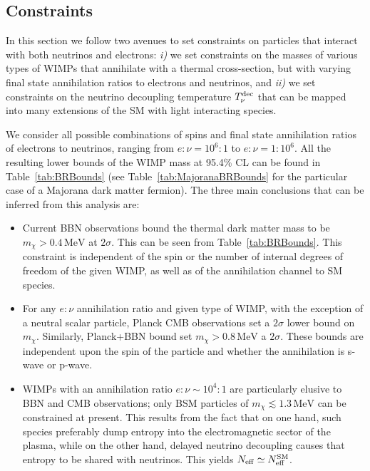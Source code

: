 \documentclass[notitlepage,letterpaper,natbib,aps,prd,onecolumn,amsmath,amsfonts,nofootinbib,preprintnumbers,superscriptaddress,secnumarabic,groupedaddress]{revtex4-1}
\begin{document}
\newpage
\subsection{Constraints}

In this section we follow two avenues to set constraints on particles that interact with both neutrinos and electrons: \textit{i)} we set constraints on the masses of various types of WIMPs that annihilate with a thermal cross-section, but with varying final state annihilation ratios to electrons and neutrinos, and \textit{ii)} we set constraints on the neutrino decoupling temperature $T_{\nu}^{\rm dec}$ that can be mapped into many extensions of the SM with light interacting species. 

We consider all possible combinations of spins and final state annihilation ratios of electrons to neutrinos, ranging from $e: \nu = 10^{6}:1 $ to $e: \nu = 1:10^{6} $. All the resulting lower bounds of the WIMP mass at 95.4\% CL can be found in Table~\ref{tab:BRBounds} (see Table~\ref{tab:MajoranaBRBounds} for the particular case of a Majorana dark matter fermion). The three main conclusions that can be inferred from this analysis are:
\begin{itemize}
    \item Current BBN observations bound the thermal dark matter mass to be  $m_\chi > 0.4\,\text{MeV}$ at $2\sigma$. This can be seen from Table~\ref{tab:BRBounds}. This constraint is independent of the spin or the number of internal degrees of freedom of the given WIMP, as well as of the annihilation channel to SM species. 
    \item For any $e:\nu$ annihilation ratio and given type of WIMP, with the exception of a neutral scalar particle, Planck CMB observations set a $2\sigma$ lower bound on $m_\chi$. Similarly, Planck+BBN bound set $m_\chi > 0.8\,\text{MeV}$ a $2\sigma$. These bounds are independent upon the spin of the particle and whether the annihilation is s-wave or p-wave. 
    \item WIMPs with an annihilation ratio $e:\nu \sim 10^4: 1$ are particularly elusive to BBN and CMB observations; only BSM particles of $m_\chi \lesssim 1.3\,\text{MeV}$ can be constrained at present. This results from the fact that on one hand, such species preferably dump entropy into the electromagnetic sector of the plasma, while on the other hand, delayed neutrino decoupling causes that entropy to be shared with neutrinos. This yields $N_{\rm eff} \simeq N_{\rm eff}^{\rm SM}$. 
\end{itemize}
\end{document}
